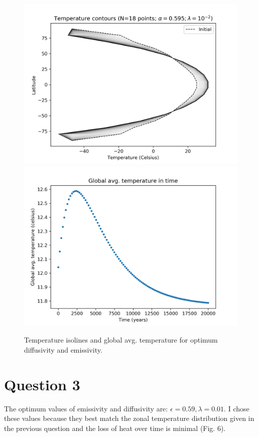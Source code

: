 \documentclass{article}
\begin{document}
\begin{figure}
\includegraphics[scale=0.7]{tcont_q3.png} 
\includegraphics[scale=0.7]{tavg_q3.png}
\caption{Temperature isolines and global avg. temperature for optimum diffusivity and emissivity.}
\end{figure}

\section*{Question 3}
The optimum values of emissivity and diffusivity are: $\epsilon = 0.59,  \lambda = 0.01$. I chose these values because they best match the zonal temperature distribution given in the previous question and the loss of heat over time is minimal (Fig. 6).
\end{document}
